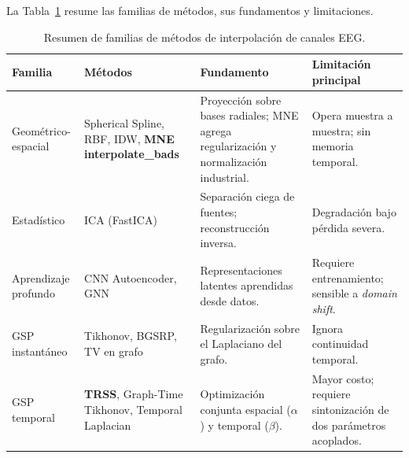 La Tabla~\ref{tab:metodos_resumen} resume las familias de métodos, sus fundamentos y limitaciones.

\begin{table}[ht]
\centering
\caption{Resumen de familias de métodos de interpolación de canales EEG.}
\label{tab:metodos_resumen}
\begin{tabular}{p{2cm}p{2.5cm}p{3.5cm}p{3.5cm}}
\toprule
\textbf{Familia} & \textbf{Métodos} & \textbf{Fundamento} & \textbf{Limitación principal} \\
\midrule
Geométrico-espacial & Spherical Spline, RBF, IDW, \textbf{MNE interpolate\_bads} & Proyección sobre bases radiales; MNE agrega regularización y normalización industrial. & Opera muestra a muestra; sin memoria temporal. \\
\addlinespace
Estadístico & ICA (FastICA) & Separación ciega de fuentes; reconstrucción inversa. & Degradación bajo pérdida severa. \\
\addlinespace
Aprendizaje profundo & CNN Autoencoder, GNN & Representaciones latentes aprendidas desde datos. & Requiere entrenamiento; sensible a \textit{domain shift}. \\
\addlinespace
GSP instantáneo & Tikhonov, BGSRP, TV en grafo & Regularización sobre el Laplaciano del grafo. & Ignora continuidad temporal. \\
\addlinespace
GSP temporal & \textbf{TRSS}, Graph-Time Tikhonov, Temporal Laplacian & Optimización conjunta espacial ($\alpha$) y temporal ($\beta$). & Mayor costo; requiere sintonización de dos parámetros acoplados. \\
\bottomrule
\end{tabular}
\end{table}